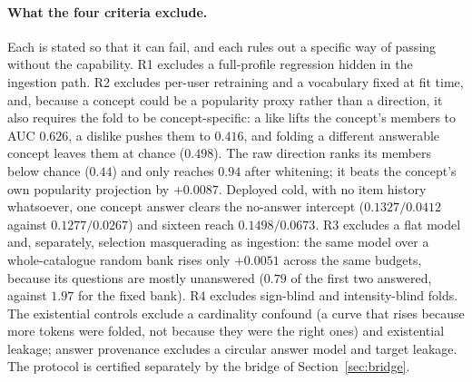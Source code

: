 \documentclass[manuscript,screen,review]{acmart}
\begin{document}
\paragraph{What the four criteria exclude.} Each is stated so that it can fail, and each rules out a specific way of passing without the capability. R1 excludes a full-profile regression hidden in the ingestion path. R2 excludes per-user retraining and a vocabulary fixed at fit time, and, because a concept could be a popularity proxy rather than a direction, it also requires the fold to be concept-specific: a like lifts the concept's members to AUC $0.626$, a dislike pushes them to $0.416$, and folding a different answerable concept leaves them at chance ($0.498$). The raw direction ranks its members below chance ($0.44$) and only reaches $0.94$ after whitening; it beats the concept's own popularity projection by $+0.0087$. Deployed cold, with no item history whatsoever, one concept answer clears the no-answer intercept ($0.1327/0.0412$ against $0.1277/0.0267$) and sixteen reach $0.1498/0.0673$. R3 excludes a flat model and, separately, selection masquerading as ingestion: the same model over a whole-catalogue random bank rises only $+0.0051$ across the same budgets, because its questions are mostly unanswered ($0.79$ of the first two answered, against $1.97$ for the fixed bank). R4 excludes sign-blind and intensity-blind folds. The existential controls exclude a cardinality confound (a curve that rises because more tokens were folded, not because they were the right ones) and existential leakage; answer provenance excludes a circular answer model and target leakage. The protocol is certified separately by the bridge of Section~\ref{sec:bridge}.
\end{document}
